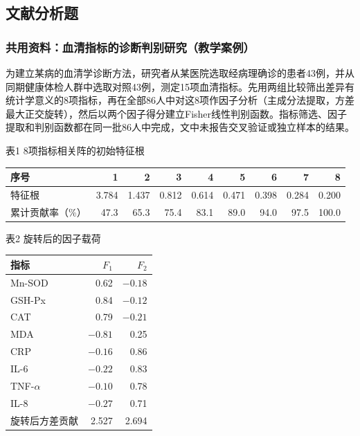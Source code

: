 \subsection{文献分析题}

\subsubsection*{共用资料：血清指标的诊断判别研究（教学案例）}

为建立某病的血清学诊断方法，研究者从某医院选取经病理确诊的患者43例，并从同期健康体检人群中选取对照43例，测定15项血清指标。先用两组比较筛出差异有统计学意义的8项指标，再在全部86人中对这8项作因子分析（主成分法提取，方差最大正交旋转），然后以两个因子得分建立Fisher线性判别函数。指标筛选、因子提取和判别函数都在同一批86人中完成，文中未报告交叉验证或独立样本的结果。

表1 \quad 8项指标相关阵的初始特征根

\begin{center}\small\setlength{\tabcolsep}{4pt}\renewcommand{\arraystretch}{1.18}\begin{tabular}{@{}lrrrrrrrr@{}}
\toprule
序号 & 1 & 2 & 3 & 4 & 5 & 6 & 7 & 8 \\
\midrule
特征根 & 3.784 & 1.437 & 0.812 & 0.614 & 0.471 & 0.398 & 0.284 & 0.200 \\
累计贡献率（\%） & 47.3 & 65.3 & 75.4 & 83.1 & 89.0 & 94.0 & 97.5 & 100.0 \\
\bottomrule\end{tabular}\end{center}

表2 \quad 旋转后的因子载荷

\begin{center}\small\setlength{\tabcolsep}{6pt}\renewcommand{\arraystretch}{1.18}\begin{tabular}{@{}lrr@{}}
\toprule
指标 & \(F_1\) & \(F_2\) \\
\midrule
Mn-SOD & 0.62 & \(-0.18\) \\
GSH-Px & 0.84 & \(-0.12\) \\
CAT & 0.79 & \(-0.21\) \\
MDA & \(-0.81\) & 0.25 \\
CRP & \(-0.16\) & 0.86 \\
IL-6 & \(-0.22\) & 0.83 \\
TNF-\(\alpha\) & \(-0.10\) & 0.78 \\
IL-8 & \(-0.27\) & 0.71 \\
\midrule
旋转后方差贡献 & 2.527 & 2.694 \\
\bottomrule\end{tabular}\end{center}

